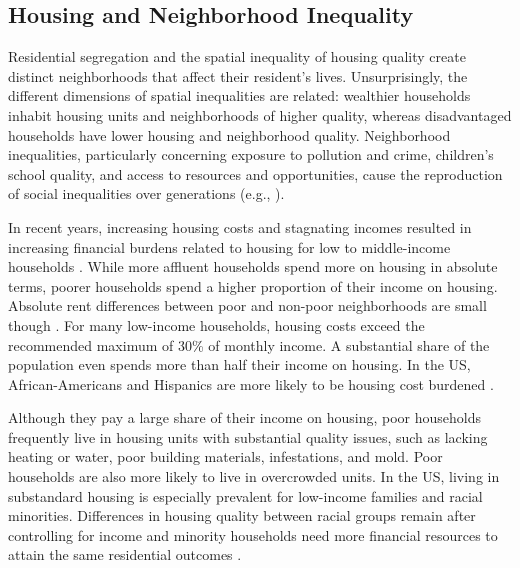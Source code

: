 \documentclass[a4paper,12pt]{article}
\begin{document}
\subsection{Housing and Neighborhood Inequality}

Residential segregation and the spatial inequality of housing quality create distinct neighborhoods that affect their resident's lives. Unsurprisingly, the different dimensions of spatial inequalities are related: wealthier households inhabit housing units and neighborhoods of higher quality, whereas disadvantaged households have lower housing and neighborhood quality. Neighborhood inequalities, particularly concerning exposure to pollution and crime, children's school quality, and access to resources and opportunities, cause the reproduction of social inequalities over generations (e.g., \cite{masseyAmericanApartheidSegregation1993, sharkeyIntergenerationalTransmissionContext2008, chettyImpactsNeighborhoodsIntergenerational2018a}).

In recent years, increasing housing costs and stagnating incomes resulted in increasing financial burdens related to housing for low to middle-income households \citep{delucaHousingInsecurityPoor2022}. While more affluent households spend more on housing in absolute terms, poorer households spend a higher proportion of their income on housing. Absolute rent differences between poor and non-poor neighborhoods are small though \citep{desmondPoorPayMore2019}. For many low-income households, housing costs exceed the recommended maximum of 30\% of monthly income. A substantial share of the population even spends more than half their income on housing. In the US, African-Americans and Hispanics are more likely to be housing cost burdened \citep{delucaHousingInsecurityPoor2022}. 

Although they pay a large share of their income on housing, poor households frequently live in housing units with substantial quality issues, such as lacking heating or water, poor building materials, infestations, and mold. Poor households are also more likely to live in overcrowded units. In the US, living in substandard housing is especially prevalent for low-income families and racial minorities. Differences in housing quality between racial groups remain after controlling for income and minority households need more financial resources to attain the same residential outcomes \citep{crowderInterneighborhoodMigrationRace2010, delucaHousingInsecurityPoor2022}. 
\end{document}
